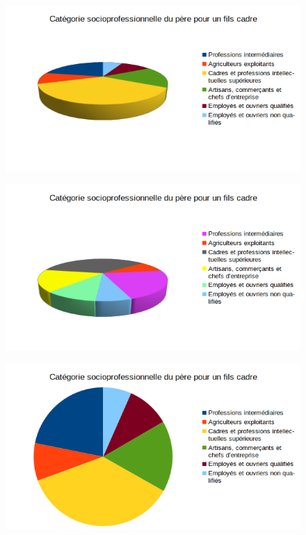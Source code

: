 \documentclass[10pt, a4paper]{article}
\begin{document}
\begin{tcolorbox}[lefttitle=2cm, colframe=gray!75!black, colback=white, title=\textbf{EXERCICE 4 : Analyse de trois datavisualisations de données.}]
\begin{figure}[H]
    \includegraphics[scale =0.47, trim={0 3cm 0 0},clip]{chapitre1/figures/img1.png}
    \caption{}
    \label{fig:enter-label}
\end{figure}

\begin{figure}[H]
    \includegraphics[scale =0.47, trim={0 2cm 0 0},clip]{chapitre1/figures/img2.png}
    \caption{}
    \label{fig:enter-label}
\end{figure}

\begin{figure}[H]
    \includegraphics[scale =0.47]{chapitre1/figures/img.png}
    \caption{}
    \label{fig:enter-label}
\end{figure}

\end{tcolorbox}
\end{document}
